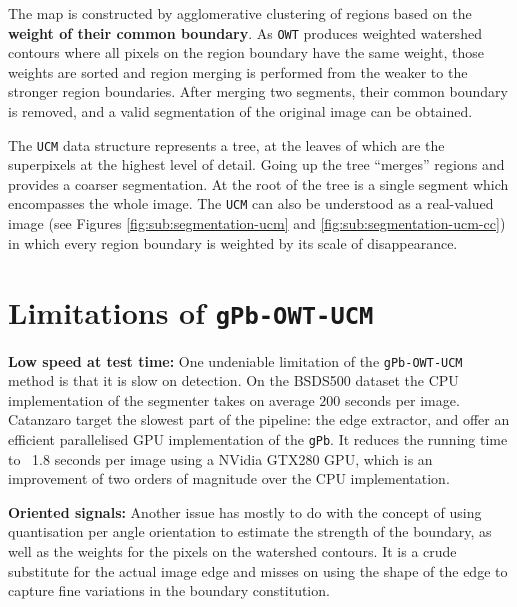 The map is constructed by agglomerative clustering of regions based on the {\bf weight of their common boundary}. As {\tt OWT} produces weighted watershed contours where all pixels on the region boundary have the same weight, those weights are sorted and region merging is performed from the weaker to the stronger region boundaries. After merging two segments, their common boundary is removed, and a valid segmentation of the original image can be obtained.

The {\tt UCM} data structure represents a tree, at the leaves of which are the superpixels at the highest level of detail. Going up the tree ``merges'' regions and provides a coarser segmentation. At the root of the tree is a single segment which encompasses the whole image. The {\tt UCM} can also be understood as a real-valued image (see Figures \ref{fig:sub:segmentation-ucm} and \ref{fig:sub:segmentation-ucm-cc}) in which every region boundary is weighted by its scale of disappearance.


\section{Limitations of {\tt gPb-OWT-UCM}} %
\textbf{Low speed at test time:} One undeniable %
limitation of the {\tt gPb-OWT-UCM} method is that it is slow on detection. On the BSDS500 dataset the CPU implementation of the segmenter takes on average $200$ seconds per image.
Catanzaro \etal \cite{Catanzaro2009efficient} target the slowest part of the pipeline: the edge extractor, and offer an efficient parallelised %
GPU implementation of the {\tt gPb}. It reduces the running time to ~1.8 seconds per image using a NVidia GTX280 GPU, which is an improvement of two orders of magnitude over the CPU implementation.

\textbf{Oriented signals:} %
Another issue has mostly to do with the concept of using quantisation per angle orientation to estimate the strength of the boundary, as well as the weights for the pixels on the watershed contours. %
It is a crude substitute for the actual image edge and misses on using the shape of the edge to capture fine variations in the boundary constitution. %

